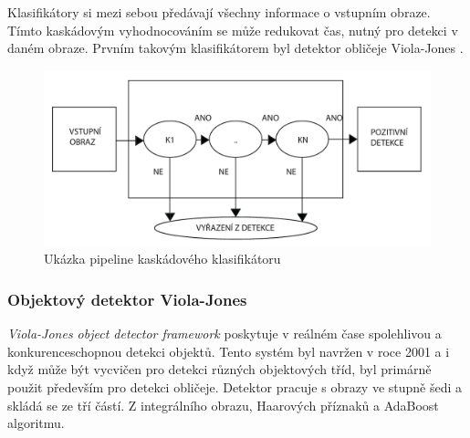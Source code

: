 Klasifikátory si mezi sebou předávají všechny informace o vstupním obraze. Tímto kaskádovým vyhodnocováním se může redukovat čas, nutný pro detekci v daném obraze. Prvním takovým klasifikátorem byl detektor obličeje Viola-Jones \cite{violajones}.  
\begin{figure}[H]
\centering
\includegraphics[width=.7\linewidth]{figures/cc.pdf}
\caption{Ukázka pipeline kaskádového klasifikátoru}
\label{fig:ccpipeline}
\end{figure}

\subsubsection{Objektový detektor Viola-Jones}
\textit{Viola-Jones object detector framework} poskytuje v reálném čase spolehlivou a konkurenceschopnou detekci objektů. Tento systém byl navržen v roce 2001 a i když může být vycvičen pro detekci různých objektových tříd, byl primárně použit především pro detekci obličeje. Detektor pracuje s obrazy ve stupně šedi a skládá se ze tří částí. Z integrálního obrazu, Haarových příznaků a AdaBoost algoritmu. 

